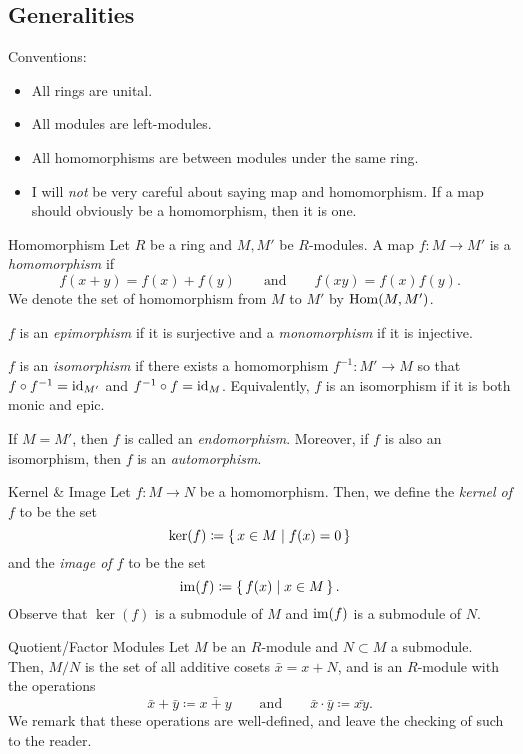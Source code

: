 \subsection{Generalities}

\begin{remark}{Conventions:}
	\begin{itemize}
		\item All rings are unital.
		\item All modules are left-modules.
		\item All homomorphisms are between modules under the same ring.
		\item I will \emph{not} be very careful about saying map and homomorphism.
		      If a map should obviously be a homomorphism, then it is one.
	\end{itemize}
\end{remark}

\begin{defn}{Homomorphism}{}
	Let $R$ be a ring and $M, M'$ be $R$-modules.
	A map $f : M \to M'$ is a \emph{homomorphism} if
	\[
		f(x + y) = f(x) + f(y) \qquad \text{and} \qquad f(xy) = f(x)f(y).
	\]
	We denote the set of homomorphism from $M$ to $M'$ by $\operatorname{Hom}(M, M')$.

	$f$ is an \emph{epimorphism} if it is surjective and a \emph{monomorphism} if it is injective.

	$f$ is an \emph{isomorphism} if there exists a homomorphism $f^{-1} : M' \to M$ so that $f \circ f^{-1} = \operatorname{id}_{M'}$ and $f^{-1} \circ f = \operatorname{id}_M$.
	Equivalently, $f$ is an isomorphism if it is both monic and epic.

	If $M = M'$, then $f$ is called an \emph{endomorphism}.
	Moreover, if $f$ is also an isomorphism, then $f$ is an \emph{automorphism}.
\end{defn}

\begin{defn}{Kernel \& Image}{}
	Let $f : M \to N$ be a homomorphism.
	Then, we define the \emph{kernel of $f$} to be the set
	\[
		\ker(f) \coloneq \set{ x \in M \mid f(x) = 0 }
	\]
	and the \emph{image of $f$} to be the set
	\[
		\operatorname{im}(f) \coloneq \set{ f(x) \mid x \in M }.
	\]
	Observe that $\ker(f)$ is a submodule of $M$ and $\operatorname{im}(f)$ is a submodule of $N$.
\end{defn}

\begin{defn}{Quotient/Factor Modules}{}
	Let $M$ be an $R$-module and $N \subset M$ a submodule.
	Then, $M / N$ is the set of all additive cosets $\bar{x} = x + N$, and is an $R$-module with the operations
	\[
		\bar{x} + \bar{y} \coloneq \bar{x + y} \qquad \text{and} \qquad \bar{x} \cdot \bar{y} \coloneq \bar{xy}.
	\]
	We remark that these operations are well-defined, and leave the checking of such to the reader.
\end{defn}

